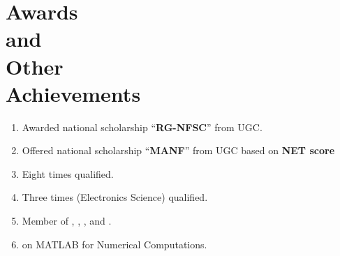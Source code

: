 \vspace{-2.5em}
\section{Awards\\and\\Other\\Achievements}
\vspace{-.5em}
\begin{enumerate}[label={\textbf{\arabic*}.\ }]
\item Awarded national scholarship ``\textbf{RG-NFSC}'' from UGC.
\item Offered national scholarship ``\textbf{MANF}''  from UGC based on \textbf{NET score} 
\item Eight times  qualified. 
\item Three times  (Electronics Science) qualified. 
\item Member of , , , and .
\item {} on MATLAB for Numerical Computations.
\end{enumerate}
\vspace{-2em}
\sectionline
